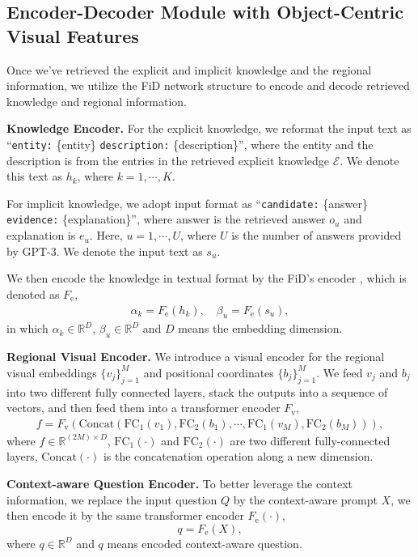 \documentclass{article}
\begin{document}
\subsection{Encoder-Decoder Module with Object-Centric Visual Features}
\label{fusion_module}

Once we've retrieved the explicit and implicit knowledge and the regional information, we utilize the FiD network structure \cite{izacard2020leveraging} to encode and decode retrieved knowledge and regional information.

\textbf{Knowledge Encoder. } For the explicit knowledge, we reformat the input text as ``\texttt{entity:} \{entity\} \texttt{description:} \{description\}'', where the entity and the description is from the entries in the retrieved explicit knowledge $\mathcal{E}$. We denote this text as $h_{k}$, where $k=1, \cdots, K$. 

For implicit knowledge, we adopt input format as ``\texttt{candidate:} \{answer\} \texttt{evidence:} \{explanation\}'', where answer is the retrieved answer $o_u$ and explanation is $e_u$. Here, $u=1, \cdots, U$, where $U$ is the number of answers provided by GPT-3. We denote the input text as $s_u$.

We then encode the knowledge in textual format by the FiD's encoder \cite{vaswani2017attention}, which is denoted as $F_{\text{e}}$,
\begin{gather}
\alpha_{k} = F_{\text{e}} (h_{k}), \quad \beta_{u} = F_{\text{e}}(s_u),
\end{gather}
in which $\alpha_{k} \in \mathbb{R}^D$, $\beta_{u} \in \mathbb{R}^{D}$ and $D$ means the embedding dimension.

\textbf{Regional Visual Encoder. } We introduce a visual encoder for the regional visual embeddings $\{v_j\}_{j=1}^M$ and positional coordinates $\{b_j\}_{j=1}^M$. We feed $v_j$ and $b_j$ into two different fully connected layers, stack the outputs into a sequence of vectors, and then feed them into a transformer encoder $F_{\text{v}}$,
	\begin{gather}
	\label{vis_v}
        f = F_{\text{v}}(\text{Concat}(\text{FC}_1(v_1), \text{FC}_2(b_1),\cdots,  \text{FC}_1(v_M), \text{FC}_2(b_M))),
    \end{gather}
where $f \in \mathbb{R}^{(2M) \times D}$, $\text{FC}_1(\cdot)$ and $\text{FC}_2(\cdot)$ are two different fully-connected layers, $\text{Concat}(\cdot)$ is the concatenation operation along a new dimension.

\textbf{Context-aware Question Encoder. } To better leverage the context information, we replace the input question $Q$ by the context-aware prompt $X$, we then encode it by the same transformer encoder $F_{\text{e}}(\cdot)$,
\begin{equation}
\label{q}
    q = F_{\text{e}}(X),
\end{equation}
where $q \in \mathbb{R}^{D}$ and $q$ means encoded context-aware question.
\end{document}
